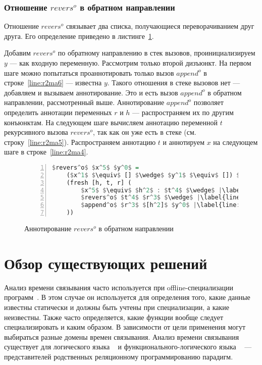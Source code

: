 \documentclass[conference,american,russian]{IEEEtran}
\begin{document}
\subsubsection{Отношение $revers^o$ в обратном направлении}

Отношение $revers^o$ связывает два списка, получающиеся переворачиванием друг друга.
Его определение приведено в листинге~\ref{lst:reversoANN2}.

Добавим $revers^o$ по обратному направлению в стек вызовов, проинициализируем $y$ --- как входную переменную.
Рассмотрим только второй дизъюнкт.
На первом шаге можно попытаться проаннотировать только вызов $append^o$ в строке~\ref{line:r2ma6} --- известна $y$.
Такого отношения в стеке вызовов нет --- добавляем и вызываем аннотирование.
Это и есть вызов $append^o$ в обратном направлении, рассмотренный выше.
Аннотирование $append^o$ позволяет определить аннотации переменных $r$ и $h$ --- распространяем их по другим конъюнктам.
На следующем шаге вычисляем аннотацию переменной $t$ рекурсивного вызова $revers^o$, так как он уже есть в стеке (см. строку~\ref{line:r2ma5}).
Распространяем аннотацию $t$ и аннотируем $x$ на следующем шаге в строке~\ref{line:r2ma4}.

\begin{figure}[h!]
  \begin{center}
  \begin{minipage}{0.32\textwidth}
  \begin{lstlisting}[language=Haskell, frame=single, numbers=left,numberstyle=\small, escapechar=|]
  $revers^o$ $x^5$ $y^0$ =
    ($x^1$ $\equiv$ [] $\wedge$ $y^1$ $\equiv$ []) $\vee$ |\label{line:r2ma2}|
    (fresh [h, t, r] (
        $x^5$ $\equiv$ $h^2$ : $t^4$ $\wedge$ |\label{line:r2ma4}|
        $revers^o$ $t^4$ $r^3$ $\wedge$ |\label{line:r2ma5}|
        $append^o$ $r^3$ $[h^2]$ $y^0$ |\label{line:r2ma6}|
    ))
    \end{lstlisting}
  \end{minipage}
  \end{center}
  \caption{Аннотирование $revers^o$ в обратном направлении}
  \label{lst:reversoANN2}
\end{figure}

\section{Обзор существующих решений}\label{related}

Анализ времени связывания часто используется при offline-специализации программ~\cite{jones1993partial}. 
В этом случае он используется для определения того, какие данные известны статически и должны быть учтены при специализации, а какие неизвестны. 
Также часто определяется, какие функции вообще следует специализировать и каким образом. 
В зависимости от цели применения могут выбираться разные домены времен связывания.
Анализ времени связывания существует для логического языка \prolog{}~\cite{leuschel2004prolog} и функционального-логического языка \mercury{}~\cite{vanhoof2004binding} --- представителей родственных реляционному программированию парадигм.
\end{document}
